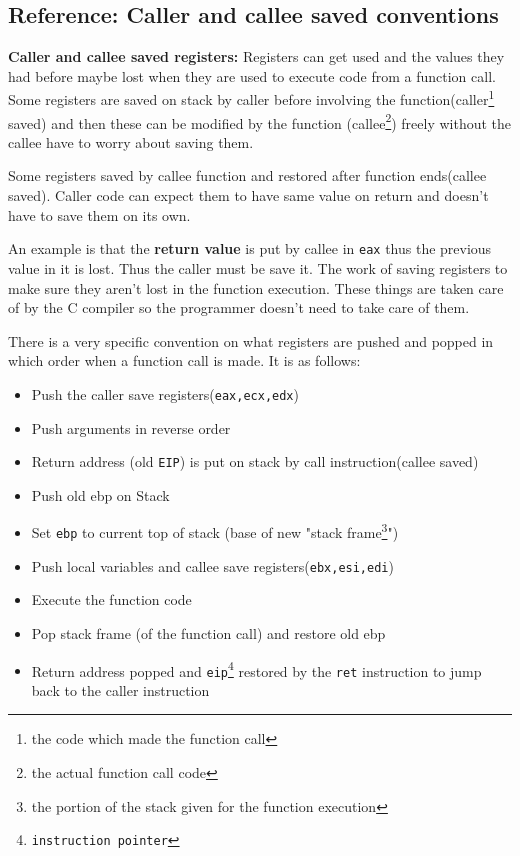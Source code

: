 \documentclass[12pt]{article}
\begin{document}
\subsection*{Reference: Caller and callee saved conventions}
\textbf{Caller and callee saved registers:} Registers can get used and the values they had before maybe lost
when they are used to execute code from a function call. Some registers are saved on stack by caller before involving the function(caller\footnote{the code which made the function call} saved)
and then these can be modified by the function (callee\footnote{the actual function call code}) freely without the callee have to worry about saving them.

Some registers saved by callee function and restored after function ends(callee saved). Caller code
can expect them to have same value on return and doesn't have to save them on its own. 

An example is that the \textbf{return value} is put by callee in \texttt{eax} thus the previous value in it is lost. Thus the caller must be save it. The 
work of saving registers to make sure they aren't lost in the function execution.
These things are taken care of by the C compiler so the programmer doesn't need to take care of them. 


There is a very specific convention on what registers are pushed and popped in which order when a function call is made.
It is as follows:
\begin{itemize}[topsep=0pt, partopsep=0pt, itemsep=0pt, parsep=0pt]
    \item Push the caller save registers(\texttt{eax,ecx,edx})
    \item Push arguments in reverse order
    \item Return address (old \texttt{EIP}) is put on stack by call instruction(callee saved)
    \item Push old ebp on Stack
    \item Set \texttt{ebp} to current top of stack (base of new "stack frame\footnote{the portion of the stack given for the function execution}")
    \item Push local variables and callee save registers(\texttt{ebx,esi,edi})
    \item Execute the function code
    \item Pop stack frame (of the function call) and restore old ebp 
    \item Return address popped and \texttt{eip\footnote{instruction pointer}} restored by the \texttt{ret} instruction to jump back to the caller instruction

\end{itemize}
\end{document}
